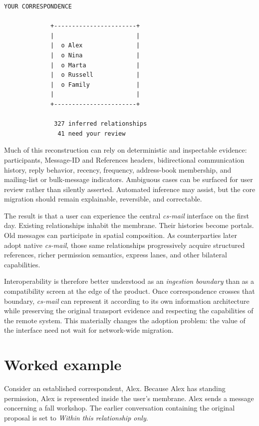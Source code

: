 \documentclass[11pt]{article}
\newcommand{\csmail}{\textit{cs-mail}}
\begin{document}
\begin{Verbatim}[fontsize=\small]
                 YOUR CORRESPONDENCE

             +-----------------------+
             |                       |
             |  o Alex               |
             |  o Nina               |
             |  o Marta              |
             |  o Russell            |
             |  o Family             |
             |                       |
             +-----------------------+

              327 inferred relationships
               41 need your review
\end{Verbatim}

Much of this reconstruction can rely on deterministic and inspectable evidence: participants, Message-ID and References headers, bidirectional communication history, reply behavior, recency, frequency, address-book membership, and mailing-list or bulk-message indicators. Ambiguous cases can be surfaced for user review rather than silently asserted. Automated inference may assist, but the core migration should remain explainable, reversible, and correctable.

The result is that a user can experience the central \csmail{} interface on the first day. Existing relationships inhabit the membrane. Their histories become portals. Old messages can participate in spatial composition. As counterparties later adopt native \csmail{}, those same relationships progressively acquire structured references, richer permission semantics, express lanes, and other bilateral capabilities.

Interoperability is therefore better understood as an \emph{ingestion boundary} than as a compatibility screen at the edge of the product. Once correspondence crosses that boundary, \csmail{} can represent it according to its own information architecture while preserving the original transport evidence and respecting the capabilities of the remote system. This materially changes the adoption problem: the value of the interface need not wait for network-wide migration.

\section{Worked example}

Consider an established correspondent, Alex. Because Alex has standing permission, Alex is represented inside the user's membrane. Alex sends a message concerning a fall workshop. The earlier conversation containing the original proposal is set to \emph{Within this relationship only}.
\end{document}
